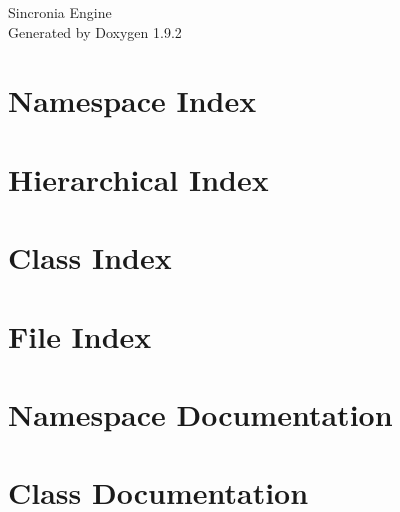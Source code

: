 \documentclass[twoside]{book}
\newcommand{\+}{\discretionary{\mbox{\scriptsize$\hookleftarrow$}}{}{}}
\newcommand{\clearemptydoublepage}{%
    \newpage{\pagestyle{empty}\cleardoublepage}%
  }
\begin{document}
  \raggedbottom
    \hypersetup{pageanchor=false,
                bookmarksnumbered=true,
                pdfencoding=unicode
               }
  \begin{titlepage}
  \vspace*{7cm}
  \begin{center}%
  {\Large Sincronia Engine}\\
  \vspace*{1cm}
  {\large Generated by Doxygen 1.9.2}\\
  \end{center}
  \end{titlepage}
  \clearemptydoublepage
  \tableofcontents
  \clearemptydoublepage
  \hypersetup{pageanchor=true}
\chapter{Namespace Index}

\chapter{Hierarchical Index}

\chapter{Class Index}

\chapter{File Index}

\chapter{Namespace Documentation}



\chapter{Class Documentation}



















\end{document}
